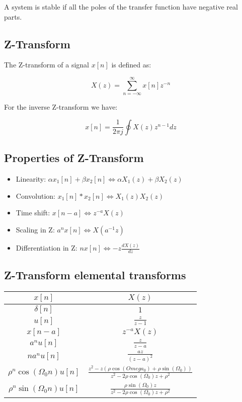 \documentclass[letterpaper]{article}
\begin{document}
\begin{multicols}{2}
        A system is stable if all the poles of the transfer function have negative real parts.

        \subsection{Z-Transform}

        The Z-transform of a signal $x[n]$ is defined as:

        \[X(z) = \sum_{n=-\infty}^{\infty} x[n]z^{-n}\]

        For the inverse Z-transform we have:

        \[x[n] = \frac{1}{2\pi j} \oint X(z)z^{n-1}dz\]

        \subsection{Properties of Z-Transform}

        \begin{itemize}
            \item Linearity: $\alpha x_1[n] +  \beta x_2[n] \Leftrightarrow \alpha X_1(z) + \beta X_2(z)$
            \item Convolution: $x_1[n] * x_2[n] \Leftrightarrow X_1(z)X_2(z)$
            \item Time shift: $x[n-a] \Leftrightarrow z^{-a}X(z)$
            \item Scaling in Z: $a^n x[n] \Leftrightarrow X(a^{-1}z)$
            \item Differentiation in Z: $nx[n] \Leftrightarrow -z \frac{dX(z)}{dz}$
        \end{itemize}

        \subsection{Z-Transform elemental transforms}

        \begin{center}
        \begin{tabular}{|c|c|}
            \hline
            $x[n]$ & $X(z)$ \\
            \hline
            $\delta[n]$ & $1$ \\
            $u[n]$ & $\frac{z}{z - 1}$ \\
            $x[n-a]$ & $z^{-a}{X(z)}$ \\
            $a^n u[n]$ & $\frac{z}{z-a}$ \\
            $n a^n u[n]$ & $\frac{az}{(z-a)^2}$ \\
            $\rho^n \cos{(\Omega_0 n)}u[n]$ & $\frac{z^2 - z (\rho \cos{(Omega_0)} + \rho \sin{(\Omega_0)})}{z^2 - 2 \rho \cos{(\Omega_0)}z + \rho^2}$ \\
            $\rho^n \sin{(\Omega_0 n)}u[n]$ & $\frac{\rho \sin{(\Omega_0)}z}{z^2 - 2 \rho \cos{(\Omega_0)}z + \rho^2}$ \\
            \hline
        \end{tabular}
        \end{center}


\end{multicols}
\end{document}
